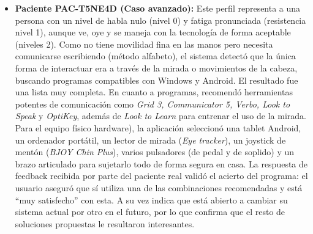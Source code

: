 \begin{itemize}
	\item \textbf{Paciente PAC-T5NE4D (Caso avanzado):}  Este perfil representa a una persona con un nivel de habla nulo (nivel 0) y fatiga pronunciada (resistencia nivel 1), aunque ve, oye y se maneja con la tecnología de forma aceptable (niveles 2). Como no tiene movilidad fina en 			las manos pero necesita comunicarse escribiendo (método alfabeto), el sistema detectó que la única forma de interactuar era a través de la mirada o movimientos de la cabeza, buscando programas compatibles con Windows y Android.
   	El resultado fue una lista muy completa. En cuanto a programas, recomendó herramientas potentes de comunicación como \textit{Grid 3, Communicator 5, Verbo, Look to Speak} y \textit{OptiKey}, además de \textit{Look to Learn} para entrenar el uso de la mirada. Para el equipo 			físico 	hardware), la aplicación seleccionó una tablet Android, un ordenador portátil, un lector de mirada (\textit{Eye tracker}), un joystick de mentón (\textit{BJOY Chin Plus}), varios pulsadores (de pedal y de soplido) y un brazo articulado para sujetarlo todo de forma segura en casa.
    	La respuesta de feedback recibida por parte del paciente real validó el acierto del programa: el usuario aseguró que sí utiliza una de las combinaciones recomendadas y está ``muy satisfecho'' con esta. A su vez indica que está abierto a cambiar su sistema actual por otro en el 			futuro, por lo que confirma que el resto de soluciones propuestas le resultaron interesantes.
	

\end{itemize}
